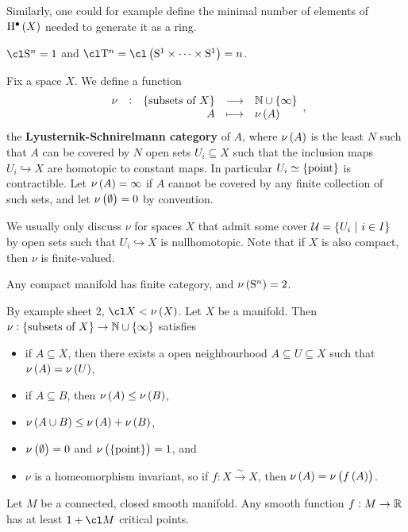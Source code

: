 Similarly, one could for example define the minimal number of elements of $ \H^\bullet\br{X} $ needed to generate it as a ring.

\begin{example*}
$ \cl \S^n = 1 $ and $ \cl \T^n = \cl \br{\S^1 \times \dots \times \S^1} = n $.
\end{example*}

Fix a space $ X $. We define a function
$$ \function[\nu]{\cbr{\text{subsets of} \ X}}{\NN \cup \cbr{\infty}}{A}{\nu\br{A}}, $$
the \textbf{Lyusternik-Schnirelmann category} of $ A $, where $ \nu\br{A} $ is the least $ N $ such that $ A $ can be covered by $ N $ open sets $ U_i \subseteq X $ such that the inclusion maps $ U_i \hookrightarrow X $ are homotopic to constant maps. In particular $ U_i \simeq \pt $ is contractible. Let $ \nu\br{A} = \infty $ if $ A $ cannot be covered by any finite collection of such sets, and let $ \nu\br{\emptyset} = 0 $ by convention.

\begin{remark*}
We usually only discuss $ \nu $ for spaces $ X $ that admit some cover $ \UUU = \cbr{U_i \st i \in I} $ by open sets such that $ U_i \hookrightarrow X $ is nullhomotopic. Note that if $ X $ is also compact, then $ \nu $ is finite-valued.
\end{remark*}

\begin{example*}
Any compact manifold has finite category, and $ \nu\br{\S^n} = 2 $.
\end{example*}

By example sheet $ 2 $, $ \cl X < \nu\br{X} $. Let $ X $ be a manifold. Then $ \nu : \cbr{\text{subsets of} \ X} \to \NN \cup \cbr{\infty} $ satisfies
\begin{itemize}
\item if $ A \subseteq X $, then there exists a open neighbourhood $ A \subseteq U \subseteq X $ such that $ \nu\br{A} = \nu\br{U} $,
\item if $ A \subseteq B $, then $ \nu\br{A} \le \nu\br{B} $,
\item $ \nu\br{A \cup B} \le \nu\br{A} + \nu\br{B} $,
\item $ \nu\br{\emptyset} = 0 $ and $ \nu\br{\pt} = 1 $, and
\item $ \nu $ is a homeomorphism invariant, so if $ f : X \xrightarrow{\sim} X $, then $ \nu\br{A} = \nu\br{f\br{A}} $.
\end{itemize}

\begin{theorem}
Let $ M $ be a connected, closed smooth manifold. Any smooth function $ f : M \to \mathbb{R} $ has at least $ 1 + \cl M $ critical points.
\end{theorem}

